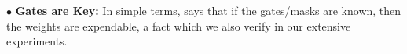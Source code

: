 $\bullet$ \textbf{Gates are Key:} In simple terms,  says that if the gates/masks are known, then the weights are expendable, a fact which we also verify in our extensive experiments.

